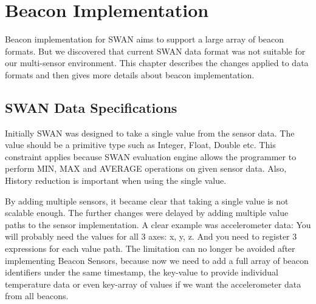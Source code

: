 
\chapter{Beacon Implementation}%

\label{Chapter4} %

Beacon implementation for SWAN aims to support a large array of beacon formats. But we discovered that current SWAN data format was not suitable 
for our multi-sensor environment. This chapter describes the changes applied to data formats and then gives more details about beacon implementation.


\section{SWAN Data Specifications}\label{ssec:swandataspecifications} 

Initially SWAN was designed to take a single value from the sensor data.
The value should be a primitive type such as Integer, Float, Double etc.
This constraint applies because SWAN evaluation engine allows the programmer to perform MIN, MAX and AVERAGE operations on given sensor data.
Also, History reduction is important when using the single value.

By adding multiple sensors, it became clear that taking a single value is not scalable enough. 
The further changes were delayed by adding multiple value paths to the sensor implementation. 
A clear example was accelerometer data: You will probably need the values for all 3 axes: x, y, z.
And you need to register 3 expressions for each value path.
The limitation can no longer be avoided after implementing Beacon Sensors, because now we need to add a full array of beacon identifiers under the same timestamp,
the key-value to provide individual temperature data or even key-array of values if we want the accelerometer data from all beacons.

